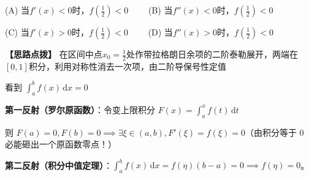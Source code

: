 \documentclass[11pt,a4paper,UTF8]{ctexart}
\begin{document}
(A) 当$f'(x) < 0$时，$f\left(\frac{1}{2}\right) < 0$ $\qquad$(B) 当$f''(x) < 0$时，$f\left(\frac{1}{2}\right) < 0$

(C) 当$f'(x) > 0$时，$f\left(\frac{1}{2}\right) < 0$ $\qquad$(D) 当$f''(x) > 0$时，$f\left(\frac{1}{2}\right) < 0$

\textbf{\color{DeepPurple}【思路点拨】} 在区间中点$x_0 = \frac{1}{2}$处作带拉格朗日余项的二阶泰勒展开，两端在$[0, 1]$积分，利用对称性消去一次项，由二阶导保号性定值


\textit{}看到 $\int_a^b f(x)\,\mathrm{d}x = 0$\textit{}

\begin{solbox}[分步推导与答题规范]
\textbf{第一反射（罗尔原函数）}：令变上限积分 $F(x) = \int_a^x f(t)\,\mathrm{d}t$

则 $F(a) = 0, F(b) = 0 \implies \exists \xi \in (a, b), F'(\xi) = f(\xi) = 0$（由积分等于 0 必能砸出一个原函数零点！）

\textbf{第二反射（积分中值定理）}：$\int_a^b f(x)\,\mathrm{d}x = f(\eta)(b - a) = 0 \implies f(\eta) = 0$。
\end{solbox}
\end{document}
